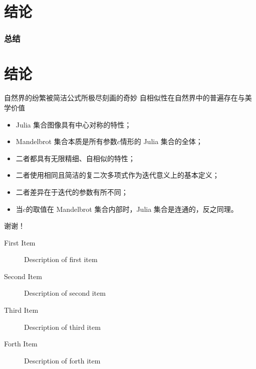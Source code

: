 \documentclass[8pt,c,compress,UTF8]{ctexbeamer}
\begin{document}
\section{结论}
\begin{frame} 
\frametitle{总结}
\section{结论}
\centering
自然界的纷繁被简洁公式所极尽刻画的奇妙
自相似性在自然界中的普遍存在与美学价值
\begin{itemize}
    \item Julia 集合图像具有中心对称的特性；
    \item Mandelbrot 集合本质是所有参数$c$情形的 Julia 集合的全体；
    \item 二者都具有无限精细、自相似的特性；
    \item 二者使用相同且简洁的复二次多项式作为迭代意义上的基本定义；
    \item 二者差异在于迭代的参数有所不同；
    \item 当$c$的取值在 Mandelbrot 集合内部时，Julia 集合是连通的，反之同理。
\end{itemize}
\centering
谢谢！
\begin{description}
\item[First Item] Description of first item
\item[Second Item] Description of second item
\item[Third Item] Description of third item
\item[Forth Item] Description of forth item
\end{description}
\end{frame}
\end{document}

